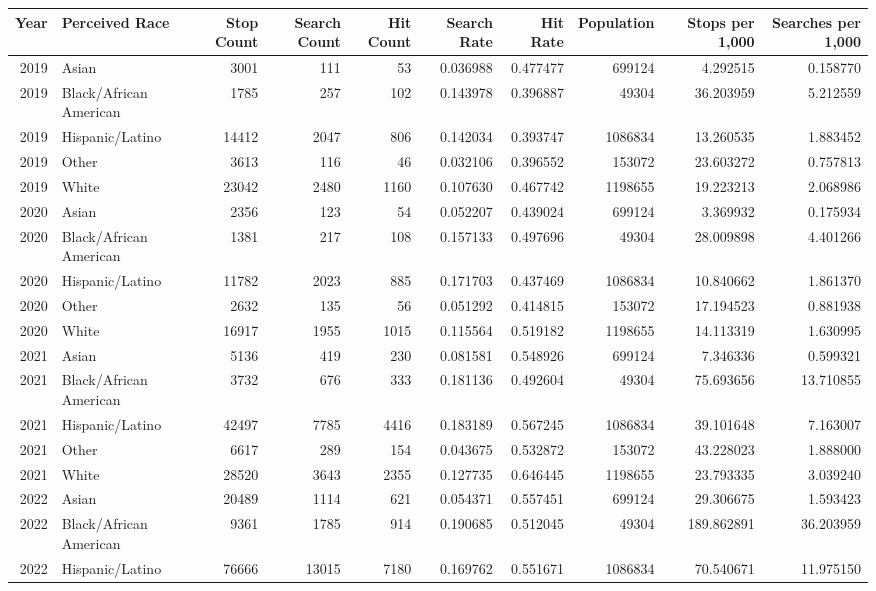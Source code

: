 \begin{tabular}{rlrrrrrrrr}
\toprule
Year & Perceived Race & Stop Count & Search Count & Hit Count & Search Rate & Hit Rate & Population & Stops per 1,000 & Searches per 1,000 \\
\midrule
2019 & Asian & 3001 & 111 & 53 & 0.036988 & 0.477477 & 699124 & 4.292515 & 0.158770 \\
2019 & Black/African American & 1785 & 257 & 102 & 0.143978 & 0.396887 & 49304 & 36.203959 & 5.212559 \\
2019 & Hispanic/Latino & 14412 & 2047 & 806 & 0.142034 & 0.393747 & 1086834 & 13.260535 & 1.883452 \\
2019 & Other & 3613 & 116 & 46 & 0.032106 & 0.396552 & 153072 & 23.603272 & 0.757813 \\
2019 & White & 23042 & 2480 & 1160 & 0.107630 & 0.467742 & 1198655 & 19.223213 & 2.068986 \\
2020 & Asian & 2356 & 123 & 54 & 0.052207 & 0.439024 & 699124 & 3.369932 & 0.175934 \\
2020 & Black/African American & 1381 & 217 & 108 & 0.157133 & 0.497696 & 49304 & 28.009898 & 4.401266 \\
2020 & Hispanic/Latino & 11782 & 2023 & 885 & 0.171703 & 0.437469 & 1086834 & 10.840662 & 1.861370 \\
2020 & Other & 2632 & 135 & 56 & 0.051292 & 0.414815 & 153072 & 17.194523 & 0.881938 \\
2020 & White & 16917 & 1955 & 1015 & 0.115564 & 0.519182 & 1198655 & 14.113319 & 1.630995 \\
2021 & Asian & 5136 & 419 & 230 & 0.081581 & 0.548926 & 699124 & 7.346336 & 0.599321 \\
2021 & Black/African American & 3732 & 676 & 333 & 0.181136 & 0.492604 & 49304 & 75.693656 & 13.710855 \\
2021 & Hispanic/Latino & 42497 & 7785 & 4416 & 0.183189 & 0.567245 & 1086834 & 39.101648 & 7.163007 \\
2021 & Other & 6617 & 289 & 154 & 0.043675 & 0.532872 & 153072 & 43.228023 & 1.888000 \\
2021 & White & 28520 & 3643 & 2355 & 0.127735 & 0.646445 & 1198655 & 23.793335 & 3.039240 \\
2022 & Asian & 20489 & 1114 & 621 & 0.054371 & 0.557451 & 699124 & 29.306675 & 1.593423 \\
2022 & Black/African American & 9361 & 1785 & 914 & 0.190685 & 0.512045 & 49304 & 189.862891 & 36.203959 \\
2022 & Hispanic/Latino & 76666 & 13015 & 7180 & 0.169762 & 0.551671 & 1086834 & 70.540671 & 11.975150 \\

\end{tabular}
